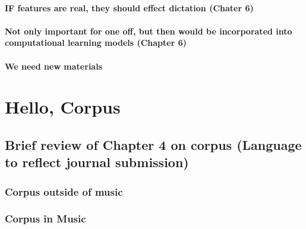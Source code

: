 \documentclass[]{book}
\theoremstyle{definition}
\theoremstyle{definition}
\theoremstyle{definition}
\theoremstyle{remark}
\begin{document}
\hypertarget{if-features-are-real-they-should-effect-dictation-chater-6}{%
\subsubsection{IF features are real, they should effect dictation
(Chater
6)}\label{if-features-are-real-they-should-effect-dictation-chater-6}}

\hypertarget{not-only-important-for-one-off-but-then-would-be-incorporated-into-computational-learning-models-chapter-6}{%
\subsubsection{Not only important for one off, but then would be
incorporated into computational learning models (Chapter
6)}\label{not-only-important-for-one-off-but-then-would-be-incorporated-into-computational-learning-models-chapter-6}}

\hypertarget{we-need-new-materials}{%
\subsubsection{We need new materials}\label{we-need-new-materials}}

\hypertarget{hello-corpus}{%
\chapter{Hello, Corpus}\label{hello-corpus}}

\hypertarget{brief-review-of-chapter-4-on-corpus-language-to-reflect-journal-submission}{%
\section{Brief review of Chapter 4 on corpus (Language to reflect
journal
submission)}\label{brief-review-of-chapter-4-on-corpus-language-to-reflect-journal-submission}}

\hypertarget{corpus-outside-of-music}{%
\subsection{Corpus outside of music}\label{corpus-outside-of-music}}

\hypertarget{corpus-in-music}{%
\subsection{Corpus in Music}\label{corpus-in-music}}
\end{document}
